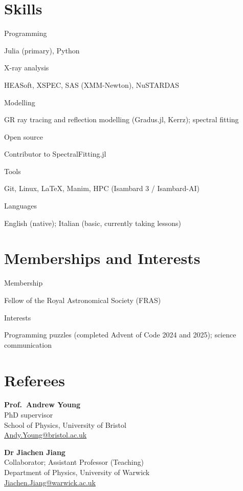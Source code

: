 \documentclass[10pt,a4paper]{article}
\newcommand{\datewidth}{2.7cm}
\newcommand{\entry}[2]{%
  \par\noindent
  \begin{minipage}[t]{\datewidth}\raggedright\leavevmode\small\color{muted}\strut#1\end{minipage}%
  \hspace{0.4cm}%
  \begin{minipage}[t]{\dimexpr\textwidth-\datewidth-0.4cm\relax}\strut#2\strut\end{minipage}%
  \par\vspace{0.3em}}
\begin{document}
\section{Skills}
\entry{Programming}{Julia (primary), Python}
\entry{X-ray analysis}{HEASoft, XSPEC, SAS (XMM-Newton), NuSTARDAS}
\entry{Modelling}{GR ray tracing and reflection modelling (Gradus.jl, Kerrz); spectral fitting}
\entry{Open source}{Contributor to SpectralFitting.jl}
\entry{Tools}{Git, Linux, LaTeX, Manim, HPC (Isambard 3 / Isambard-AI)}
\entry{Languages}{English (native); Italian (basic, currently taking lessons)}
 
\section{Memberships and Interests}
\entry{Membership}{Fellow of the Royal Astronomical Society (FRAS)}
\entry{Interests}{Programming puzzles (completed Advent of Code 2024 and 2025); science communication}
 
\section{Referees}
\noindent
\begin{minipage}[t]{0.48\textwidth}
  \textbf{Prof.\ Andrew Young}\\
  PhD supervisor\\
  School of Physics, University of Bristol\\
  \href{mailto:Andy.Young@bristol.ac.uk}{Andy.Young@bristol.ac.uk}
\end{minipage}\hfill
\begin{minipage}[t]{0.48\textwidth}
  \textbf{Dr Jiachen Jiang}\\
  Collaborator; Assistant Professor (Teaching)\\
  Department of Physics, University of Warwick\\
  \href{mailto:Jiachen.Jiang@warwick.ac.uk}{Jiachen.Jiang@warwick.ac.uk}
\end{minipage}
 
\end{document}

